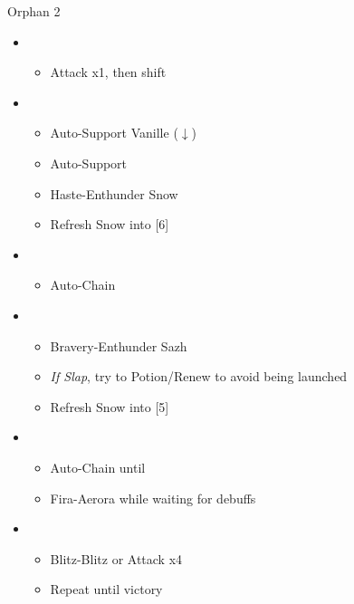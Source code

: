 \begin{battle}{Orphan 2}
	\begin{itemize}
		\item \second
			\begin{itemize}
				\item Attack x1, then shift
			\end{itemize}
		\item \fourth
			\begin{itemize}
				\item Auto-Support Vanille ($\downarrow$)
				\item Auto-Support
				\item Haste-Enthunder Snow
				\item Refresh Snow into [6]
			\end{itemize}
		\item \sixth
			\begin{itemize}
				\item Auto-Chain
			\end{itemize}
		\item \fourth
			\begin{itemize}
				\item Bravery-Enthunder Sazh
				\item \textit{If Slap}, try to Potion/Renew to avoid being launched
				\item Refresh Snow into [5]
			\end{itemize}
		\item \fifth
			\begin{itemize}
				\item Auto-Chain until \stagger
				\item Fira-Aerora while waiting for debuffs
			\end{itemize}
		\item \second
			\begin{itemize}
				\item Blitz-Blitz or Attack x4
				\item Repeat until victory
			\end{itemize}
	\end{itemize}
\end{battle}